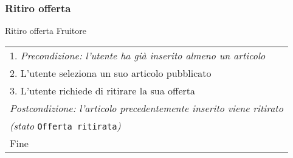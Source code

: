 \begin{minipage}{\textwidth}
    \subsubsection{Ritiro offerta}
    \usecase
        {Ritiro offerta}
        {
            Fruitore %
        }
        {
            \begin{tabular}{l}
                1. \textit{Precondizione: l'utente ha già inserito almeno un articolo}\\
                2. L'utente seleziona un suo articolo pubblicato\\
                3. L'utente richiede di ritirare la sua offerta\\
                \textit{Postcondizione: l'articolo precedentemente inserito viene ritirato}\\
                \textit{(stato }\texttt{Offerta ritirata}\textit{)}\\
                Fine
            \end{tabular}\\


        }
        \vspace{0.5cm}
\end{minipage}